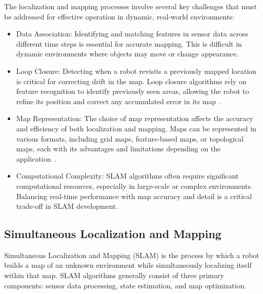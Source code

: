 The localization and mapping processes involve several key challenges that must be addressed for effective operation in dynamic, real-world environments:
\begin{itemize}
    \item Data Association: Identifying and matching features in sensor data across different time steps is essential for accurate mapping. This is difficult in dynamic environments where objects may move or change appearance.
    \item Loop Closure: Detecting when a robot revisits a previously mapped location is critical for correcting drift in the map. Loop closure algorithms rely on feature recognition to identify previously seen areas, allowing the robot to refine its position and correct any accumulated error in its map~\cite{loop_closure}.
    \item Map Representation: The choice of map representation affects the accuracy and efficiency of both localization and mapping. Maps can be represented in various formats, including grid maps, feature-based maps, or topological maps, each with its advantages and limitations depending on the application~\cite{map_representations}.
    \item Computational Complexity: SLAM algorithms often require significant computational resources, especially in large-scale or complex environments. Balancing real-time performance with map accuracy and detail is a critical trade-off in SLAM development.
\end{itemize}

\subsection{Simultaneous Localization and Mapping}

Simultaneous Localization and Mapping (SLAM) is the process by which a robot builds a map of an unknown environment while simultaneously localizing itself within that map. SLAM algorithms generally consist of three primary components: sensor data processing, state estimation, and map optimization.

